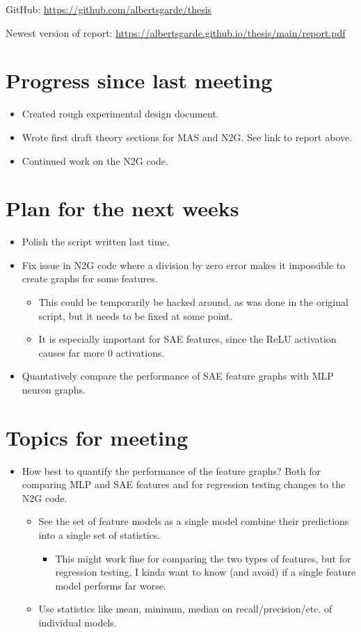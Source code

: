 \documentclass[main.tex]{subfiles}
\begin{document}
GitHub: \url{https://github.com/albertsgarde/thesis}

Newest version of report: \url{https://albertsgarde.github.io/thesis/main/report.pdf}


\section*{Progress since last meeting}
\begin{itemize}
    \item Created rough experimental design document.
    \item Wrote first draft theory sections for MAS and N2G.
    See link to report above.
    \item Continued work on the N2G code.
\end{itemize}
\section*{Plan for the next weeks}
\begin{itemize}
    \item Polish the script written last time.
    \item Fix issue in N2G code where a division by zero error 
    makes it impossible to create graphs for some features.
    \begin{itemize}
        \item This could be temporarily be hacked around, 
        as was done in the original script, 
        but it needs to be fixed at some point.
        \item It is especially important for SAE features, 
        since the ReLU activation causes far more $0$ activations.
    \end{itemize}
    \item Quantatively compare the performance of SAE feature graphs 
    with MLP neuron graphs.
\end{itemize}
\section*{Topics for meeting}
\begin{itemize}
    \item How best to quantify the performance of the feature graphs? 
    Both for comparing MLP and SAE features 
    and for regression testing changes to the N2G code.
    \begin{itemize}
        \item See the set of feature models as a single model 
        combine their predictions into a single set of statistics.
        \begin{itemize}
            \item This might work fine for comparing the two types of features, 
            but for regression testing, 
            I kinda want to know (and avoid) if a single feature model 
            performs far worse.
        \end{itemize}
        \item Use statistics like mean, mininum, median on 
        recall/precision/etc. of individual models.
    \end{itemize}
\end{itemize}
\end{document}
